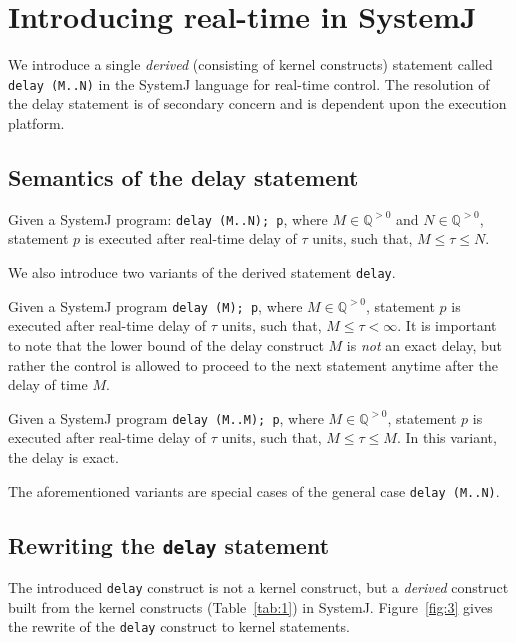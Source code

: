 \section{Introducing real-time in SystemJ}
\label{sec:intr-real-time}

We introduce a single \textit{derived} (consisting of kernel constructs)
statement called \mbox{\texttt{delay (M..N)}} in the SystemJ language
for real-time control. The resolution of the delay statement is of
secondary concern and is dependent upon the execution platform.

\subsection{Semantics of the delay statement}
\label{sec:semant-delay-stat}

Given a SystemJ program: \texttt{delay (M..N); p}, where $M \in
\mathbb{Q}^{>0}$ and $N \in \mathbb{Q}^{>0}$, statement $p$ is executed
after real-time delay of $\tau$ units, such that, $M \leq \tau \leq N$.

We also introduce two variants of the derived statement \texttt{delay}.
\begin{enumerate*}
\item Given a SystemJ program \texttt{delay (M); p}, where $M \in
  \mathbb{Q}^{>0}$, statement $p$ is executed after real-time delay of
  $\tau$ units, such that, $M \leq \tau < \infty$. It is important to
  note that the lower bound of the delay construct $M$ is \textit{not}
  an exact delay, but rather the control is allowed to proceed to the
  next statement anytime after the delay of time $M$.
\item Given a SystemJ program \texttt{delay (M..M); p}, where $M \in
  \mathbb{Q}^{>0}$, statement $p$ is executed after real-time delay of
  $\tau$ units, such that, $M \leq \tau \leq M$. In this variant, the
  delay is exact.
\end{enumerate*}

The aforementioned variants are special cases of the general case
\texttt{delay (M..N)}.

\subsection{Rewriting the \texttt{delay} statement}
\label{sec:rewr-delay-stat}

The introduced \texttt{delay} construct is not a kernel construct, but a
\textit{derived} construct built from the kernel constructs
(Table~\ref{tab:1}) in SystemJ. Figure~\ref{fig:3} gives the rewrite of
the \texttt{delay} construct to kernel statements.

